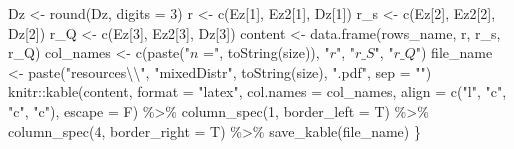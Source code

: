 \documentclass[
]{article}
\newenvironment{Shaded}{\begin{snugshade}}{\end{snugshade}}
\newcommand{\AttributeTok}[1]{\textcolor[rgb]{0.77,0.63,0.00}{#1}}
\newcommand{\DecValTok}[1]{\textcolor[rgb]{0.00,0.00,0.81}{#1}}
\newcommand{\FunctionTok}[1]{\textcolor[rgb]{0.00,0.00,0.00}{#1}}
\newcommand{\NormalTok}[1]{#1}
\newcommand{\OtherTok}[1]{\textcolor[rgb]{0.56,0.35,0.01}{#1}}
\newcommand{\SpecialCharTok}[1]{\textcolor[rgb]{0.00,0.00,0.00}{#1}}
\newcommand{\StringTok}[1]{\textcolor[rgb]{0.31,0.60,0.02}{#1}}
\begin{document}
\begin{Shaded}
\begin{Highlighting}[]
\NormalTok{    Dz }\OtherTok{\textless{}{-}} \FunctionTok{round}\NormalTok{(Dz, }\AttributeTok{digits =} \DecValTok{3}\NormalTok{)}
\NormalTok{    r }\OtherTok{\textless{}{-}} \FunctionTok{c}\NormalTok{(Ez[}\DecValTok{1}\NormalTok{], Ez2[}\DecValTok{1}\NormalTok{], Dz[}\DecValTok{1}\NormalTok{])}
\NormalTok{    r\_s }\OtherTok{\textless{}{-}} \FunctionTok{c}\NormalTok{(Ez[}\DecValTok{2}\NormalTok{], Ez2[}\DecValTok{2}\NormalTok{], Dz[}\DecValTok{2}\NormalTok{])}
\NormalTok{    r\_Q }\OtherTok{\textless{}{-}} \FunctionTok{c}\NormalTok{(Ez[}\DecValTok{3}\NormalTok{], Ez2[}\DecValTok{3}\NormalTok{], Dz[}\DecValTok{3}\NormalTok{])}
\NormalTok{    content }\OtherTok{\textless{}{-}} \FunctionTok{data.frame}\NormalTok{(rows\_name, r, r\_s, r\_Q)}
\NormalTok{    col\_names }\OtherTok{\textless{}{-}} \FunctionTok{c}\NormalTok{(}\FunctionTok{paste}\NormalTok{(}\StringTok{"$n$ ="}\NormalTok{, }\FunctionTok{toString}\NormalTok{(size)), }\StringTok{"$r$"}\NormalTok{, }\StringTok{"$r\_S$"}\NormalTok{, }\StringTok{"$r\_Q$"}\NormalTok{)}
\NormalTok{    file\_name }\OtherTok{\textless{}{-}} \FunctionTok{paste}\NormalTok{(}\StringTok{"resources}\SpecialCharTok{\textbackslash{}\textbackslash{}}\StringTok{"}\NormalTok{, }\StringTok{"mixedDistr"}\NormalTok{, }\FunctionTok{toString}\NormalTok{(size), }\StringTok{".pdf"}\NormalTok{, }\AttributeTok{sep =} \StringTok{""}\NormalTok{)}
\NormalTok{    knitr}\SpecialCharTok{::}\FunctionTok{kable}\NormalTok{(content, }\AttributeTok{format =} \StringTok{"latex"}\NormalTok{, }\AttributeTok{col.names =}\NormalTok{ col\_names, }\AttributeTok{align =} \FunctionTok{c}\NormalTok{(}\StringTok{"l"}\NormalTok{, }
        \StringTok{"c"}\NormalTok{, }\StringTok{"c"}\NormalTok{, }\StringTok{"c"}\NormalTok{), }\AttributeTok{escape =}\NormalTok{ F) }\SpecialCharTok{\%\textgreater{}\%} \FunctionTok{column\_spec}\NormalTok{(}\DecValTok{1}\NormalTok{, }\AttributeTok{border\_left =}\NormalTok{ T) }\SpecialCharTok{\%\textgreater{}\%} \FunctionTok{column\_spec}\NormalTok{(}\DecValTok{4}\NormalTok{, }
        \AttributeTok{border\_right =}\NormalTok{ T) }\SpecialCharTok{\%\textgreater{}\%} \FunctionTok{save\_kable}\NormalTok{(file\_name)}
\NormalTok{\}}
\end{Highlighting}
\end{Shaded}
\end{document}

